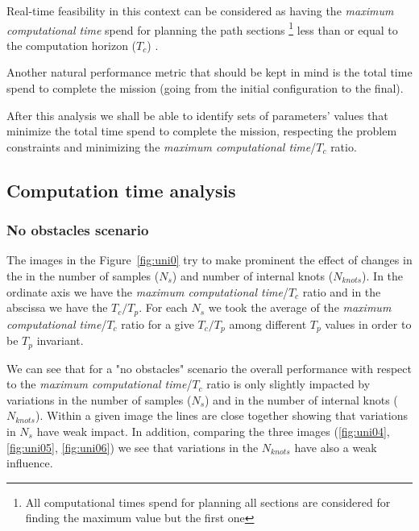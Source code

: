 Real-time feasibility in this context can be considered as having the \textit{maximum computational time} spend for planning the path sections
\footnote{All computational times spend for planning all sections are considered for finding the maximum value but the first one} less than or equal to the computation horizon ($T_c$) .

Another natural performance metric that should be kept in mind is the total time spend to complete the mission (going from the initial configuration to the final).

After this analysis we shall be able to identify sets of parameters' values that minimize the total time spend to complete the mission, respecting the problem constraints
and minimizing the \textit{maximum computational time}/$T_c$ ratio.


\subsection{Computation time analysis}

\subsubsection{No obstacles scenario}

The images in the Figure~\ref{fig:uni0} try to make prominent the effect of changes in the in the number of samples ($N_s$) and number of internal knots ($N_{knots}$). In the ordinate axis we have the \textit{maximum computational time}/$T_c$ ratio and in the abscissa we have the $T_c/T_p$. For each $N_s$ we took the average of the \textit{maximum computational time}/$T_c$ ratio for a give $T_c/T_p$ among different $T_p$ values in order to be $T_p$ invariant.

We can see that for a "no obstacles" scenario the overall performance with respect to the \textit{maximum computational time}/$T_c$ ratio is only slightly impacted by variations in the number of samples ($N_s$) and in the number of internal knots ($N_{knots}$). Within a given image the lines are close together showing that variations in $N_s$ have weak impact. In addition, comparing the three images (\ref{fig:uni04}, \ref{fig:uni05}, \ref{fig:uni06}) we see that variations in the $N_{knots}$ have also a weak influence.

